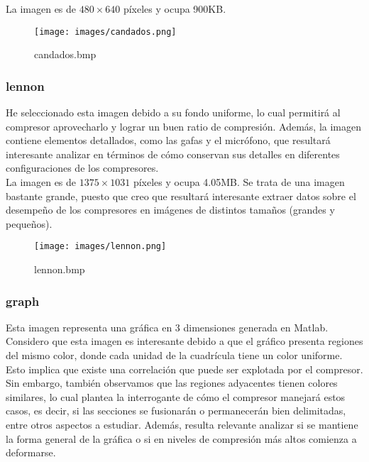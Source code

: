 \documentclass[12pt,a4paper]{article}
\begin{document}
La imagen es de $480\times640$ píxeles y ocupa 900KB.\\

\begin{figure}[H]
    \centering
    \texttt{[image: images/candados.png]}
    \caption{candados.bmp}
    
\end{figure}
\break

\subsubsection{lennon}
He seleccionado esta imagen debido a su fondo uniforme, lo cual permitirá al compresor aprovecharlo y lograr un buen ratio de compresión. Además, la imagen contiene elementos detallados, como las gafas y el micrófono, que resultará interesante analizar en términos de cómo conservan sus detalles en diferentes configuraciones de los compresores.\\

La imagen es de $1375\times1031$ píxeles y ocupa 4.05MB. Se trata de una imagen bastante grande, puesto que creo que resultará interesante extraer datos sobre el desempeño de los compresores en imágenes de distintos tamaños (grandes y pequeños).\\

\begin{figure}[H]
    \centering
    \texttt{[image: images/lennon.png]}
    \caption{lennon.bmp}
    
\end{figure}

\break
\subsubsection{graph}
Esta imagen representa una gráfica en 3 dimensiones generada en Matlab. Considero que esta imagen es interesante debido a que el gráfico presenta regiones del mismo color, donde cada unidad de la cuadrícula tiene un color uniforme. Esto implica que existe una correlación que puede ser explotada por el compresor. Sin embargo, también observamos que las regiones adyacentes tienen colores similares, lo cual plantea la interrogante de cómo el compresor manejará estos casos, es decir, si las secciones se fusionarán o permanecerán bien delimitadas, entre otros aspectos a estudiar. Además, resulta relevante analizar si se mantiene la forma general de la gráfica o si en niveles de compresión más altos comienza a deformarse.
\end{document}
